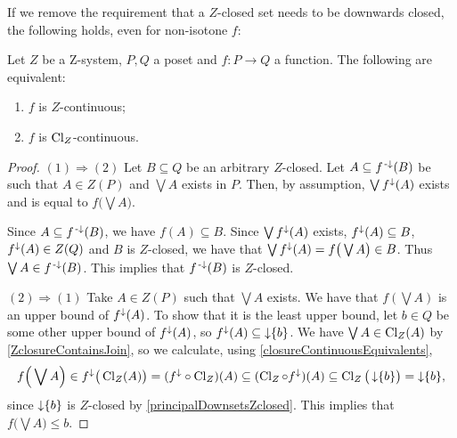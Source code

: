 If we remove the requirement that a $Z$-closed set needs to be downwards closed, the following holds, even for non-isotone $f$:
\begin{proposition} \label{ZcontinuityZclosureContinuity}
Let $Z$ be a $\mathrm{Z}$-system, $P,Q$ a poset and $f: P\to Q$ a function. The following are equivalent:
\begin{enumerate}
\item $f$ is $Z$-continuous;
\item $f$ is $\operatorname{Cl}_{Z}$-continuous.
\end{enumerate}
\end{proposition}
\begin{proof}
$(1) \Rightarrow (2)$ Let $B\subseteq Q$ be an arbitrary $Z$-closed. Let $A\subseteq f^{\text{\hspace{0.15em}-}\downarrow}(B)$ be such that $A\in Z(P)$ and $\bigvee A$ exists in $P$. Then, by assumption, $\bigvee f^\downarrow(A)$ exists and is equal to $f\big(\bigvee A\big)$.

Since $A\subseteq f^{\text{\hspace{0.15em}-}\downarrow}(B)$, we have $f(A) \subseteq B$. Since $\bigvee f^\downarrow(A)$ exists, $f^\downarrow(A)\subseteq B$, $f^\downarrow(A) \in Z(Q)$ and $B$ is $Z$-closed, we have that $\bigvee f^\downarrow(A) = f\big(\bigvee A\big) \in B$. Thus $\bigvee A \in f^{\text{\hspace{0.15em}-}\downarrow}(B)$. This implies that $f^{\text{\hspace{0.15em}-}\downarrow}(B)$ is $Z$-closed.

$(2) \Rightarrow (1)$ Take $A\in Z(P)$ such that $\bigvee A$ exists. We have that $f(\bigvee A)$ is an upper bound of $f^\downarrow(A)$. To show that it is the least upper bound, let $b\in Q$ be some other upper bound of $f^\downarrow(A)$, so $f^\downarrow(A) \subseteq \operatorname{\downarrow}\{b\}$.
We have $\bigvee A \in \operatorname{Cl}_Z(A)$ by \ref{ZclosureContainsJoin}, so we calculate, using \ref{closureContinuousEquivalents},
\[ f\Big(\bigvee A\Big) \in f^\downarrow\big(\operatorname{Cl}_Z(A)\big) = (f^\downarrow\circ \operatorname{Cl}_Z)(A) \subseteq (\operatorname{Cl}_Z\circ f^\downarrow)(A)\subseteq \operatorname{Cl}_Z\big(\operatorname{\downarrow}\{b\}\big) = \operatorname{\downarrow}\{b\}, \]
since $\operatorname{\downarrow}\{b\}$ is $Z$-closed by \ref{principalDownsetsZclosed}. This implies that $f\big(\bigvee A\big) \leq b$.
\end{proof}


